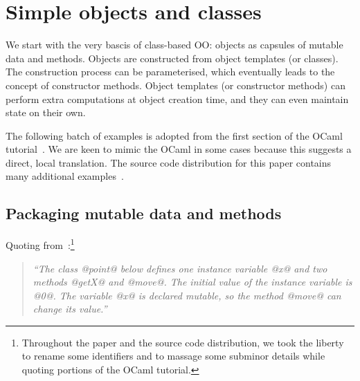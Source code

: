 





\section{Simple objects and classes}
\label{S:simple}

We start with the very bascis of class-based OO: objects as capsules
of mutable data and methods. Objects are constructed from object
templates (or classes). The construction process can be parameterised,
which eventually leads to the concept of constructor methods.  Object
templates (or constructor methods) can perform extra computations at
object creation time, and they can even maintain state on their own.

\myskip

\noindent
The following batch of examples is adopted from the first section of
the OCaml tutorial~\cite[\S\,3.1]{OCaml}. We are keen to mimic the
OCaml in some cases because this suggests a direct, local translation.
The source code distribution for this paper contains many additional
examples~\cite{OOHaskell}.






\subsection{Packaging mutable data and methods}

Quoting from~\cite[\S\,3.1]{OCaml}:\footnote{Throughout the paper and
the source code distribution, we took the liberty to rename some
identifiers and to massage some subminor details while quoting
portions of the OCaml tutorial.}

\begin{quote}\itshape
``The class @point@ below defines one instance variable @x@ and two
methods @getX@ and @move@. The initial value of the instance variable
is @0@. The variable @x@ is declared mutable, so the method @move@ can
change its value.''
\end{quote}

